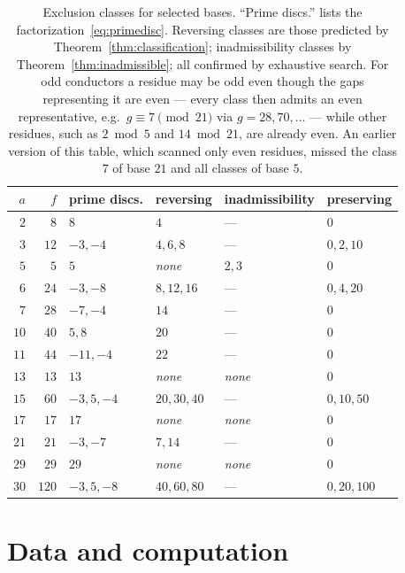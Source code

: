 \documentclass[11pt,reqno]{amsart}
\theoremstyle{plain}
\theoremstyle{definition}
\begin{document}
\begin{table}[t]
\centering
\caption{Exclusion classes for selected bases. ``Prime discs.'' lists the
factorization~\eqref{eq:primedisc}. Reversing classes are those predicted by
Theorem~\ref{thm:classification}; inadmissibility classes by
Theorem~\ref{thm:inadmissible}; all confirmed by exhaustive search. For odd
conductors a residue may be odd even though the gaps representing it are
even --- every class then admits an even representative, e.g.\
$g \equiv 7 \pmod{21}$ via $g = 28, 70, \dots$ --- while other residues, such
as $2 \bmod 5$ and $14 \bmod 21$, are already even. An earlier version of this
table, which scanned only even residues, missed the class $7$ of base $21$
and all classes of base $5$.}
\label{tab:classification}
\begin{tabular}{rrllll}
\toprule
$a$ & $f$ & prime discs. & reversing & inadmissibility & preserving \\
\midrule
$2$  & $8$   & $8$          & $4$          & ---      & $0$ \\
$3$  & $12$  & $-3, -4$     & $4, 6, 8$    & ---      & $0, 2, 10$ \\
$5$  & $5$   & $5$          & \emph{none}  & $2, 3$   & $0$ \\
$6$  & $24$  & $-3, -8$     & $8, 12, 16$  & ---      & $0, 4, 20$ \\
$7$  & $28$  & $-7, -4$     & $14$         & ---      & $0$ \\
$10$ & $40$  & $5, 8$       & $20$         & ---      & $0$ \\
$11$ & $44$  & $-11, -4$    & $22$         & ---      & $0$ \\
$13$ & $13$  & $13$         & \emph{none}  & \emph{none} & $0$ \\
$15$ & $60$  & $-3, 5, -4$  & $20, 30, 40$ & ---      & $0, 10, 50$ \\
$17$ & $17$  & $17$         & \emph{none}  & \emph{none} & $0$ \\
$21$ & $21$  & $-3, -7$     & $7, 14$      & ---      & $0$ \\
$29$ & $29$  & $29$         & \emph{none}  & \emph{none} & $0$ \\
$30$ & $120$ & $-3, 5, -8$  & $40, 60, 80$ & ---      & $0, 20, 100$ \\
\bottomrule
\end{tabular}
\end{table}

\section{Data and computation}
\label{sec:computation}
\end{document}
